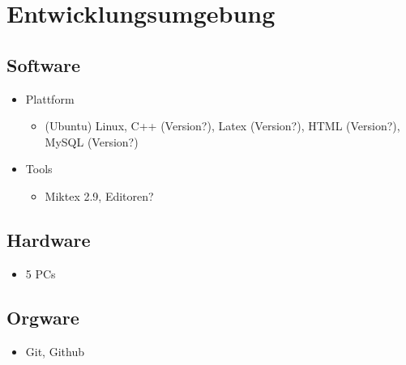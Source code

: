 
\section{Entwicklungsumgebung}


\subsection{Software}

\begin{itemize}
  \item Plattform
    \begin{itemize}
		\item (Ubuntu) Linux, C++ (Version?), Latex (Version?), HTML (Version?), MySQL (Version?)
    \end{itemize}
  \item Tools
    \begin{itemize}
  		\item Miktex 2.9, Editoren?
    \end{itemize}

\end{itemize}

\subsection{Hardware}

\begin{itemize}
	\item 5 PCs
\end{itemize}

\subsection{Orgware}

\begin{itemize}
  	\item Git, Github
\end{itemize}
